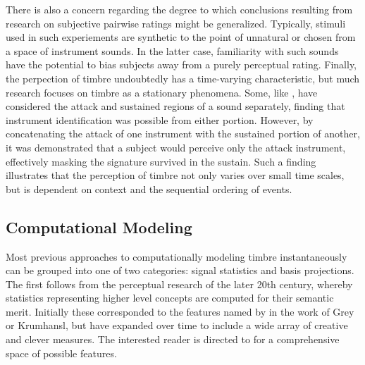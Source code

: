There is also a concern regarding the degree to which conclusions resulting from research on subjective pairwise ratings might be generalized.
Typically, stimuli used in such experiements are synthetic to the point of unnatural \cite{Teresawa2007?} or chosen from a space of instrument sounds.
In the latter case, familiarity with such sounds have the potential to bias subjects away from a purely perceptual rating.
Finally, the perpection of timbre undoubtedly has a time-varying characteristic, but much research focuses on timbre as a stationary phenomena.
Some, like \cite{Krumhansl1980?}, have considered the attack and sustained regions of a sound separately, finding that instrument identification was possible from either portion.
However, by concatenating the attack of one instrument with the sustained portion of another, it was demonstrated that a subject would perceive only the attack instrument, effectively masking the signature survived in the sustain.
Such a finding illustrates that the perception of timbre not only varies over small time scales, but is dependent on context and the sequential ordering of events.




\subsection{Computational Modeling}
Most previous approaches to computationally modeling timbre instantaneously can be grouped into one of two categories: signal statistics and basis projections.
The first follows from the perceptual research of the later 20th century, whereby statistics representing higher level concepts are computed for their semantic merit.
Initially these corresponded to the features named by in the work of Grey or Krumhansl, but have expanded over time to include a wide array of creative and clever measures.
The interested reader is directed to \cite{Essid2006} for a comprehensive space of possible features.


